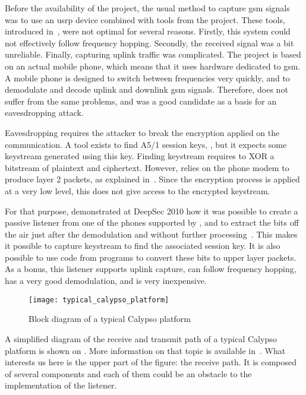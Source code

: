     Before the availability of the  project, the usual
    method to capture \gls{gsm} signals was to use an \gls{usrp} device
    combined with tools from the  project. These tools,
    introduced in~, were not optimal for several
    reasons. Firstly, this system could not effectively follow frequency
    hopping. Secondly, the received signal was a bit unreliable.
    Finally, capturing uplink traffic was complicated. The
     project is based on an actual mobile phone, which
    means that it uses hardware dedicated to \gls{gsm}. A mobile phone
    is designed to switch between frequencies very quickly, and to
    demodulate and decode uplink and downlink \gls{gsm} signals.
    Therefore,  does not suffer from the same problems,
    and was a good candidate as a basis for an eavesdropping attack.

    Eavesdropping requires the attacker to break the encryption applied
    on the communication. A tool exists to find A5/1 session keys,
    , but it expects some keystream generated using this
    key. Finding keystream requires to XOR a bitstream of plaintext and
    ciphertext. However,  relies on the phone modem to
    produce layer 2 packets, as explained in~. Since the
    encryption process is applied at a very low level, this does not
    give access to the encrypted keystream.

    For that purpose,  demonstrated at DeepSec 2010
    how it was possible to create a passive listener from one of the
    phones supported by , and to extract the bits off
    the air just after the demodulation and without further
    processing~\cite{munaut_cheap_2010}. This makes it possible to
    capture keystream to find the associated session key. It is also
    possible to use code from  programs to convert these
    bits to upper layer packets. As a bonus, this listener supports
    uplink capture, can follow frequency hopping, has a very good
    demodulation, and is very inexpensive. 

    \begin{figure}
      \centering
      \texttt{[image: typical\_calypso\_platform]}
      \caption{Block diagram of a typical Calypso
              platform~\cite{munaut_further_2012}}
      \label{fig:typical_calypso_platform}
    \end{figure}

    A simplified diagram of the receive and transmit path of a typical
    Calypso platform is shown on .
    More information on that topic is available in~.
    What interests us here is the upper part of the figure: the
    receive path. It is composed of several components and each of
    them could be an obstacle to the implementation of the listener.

